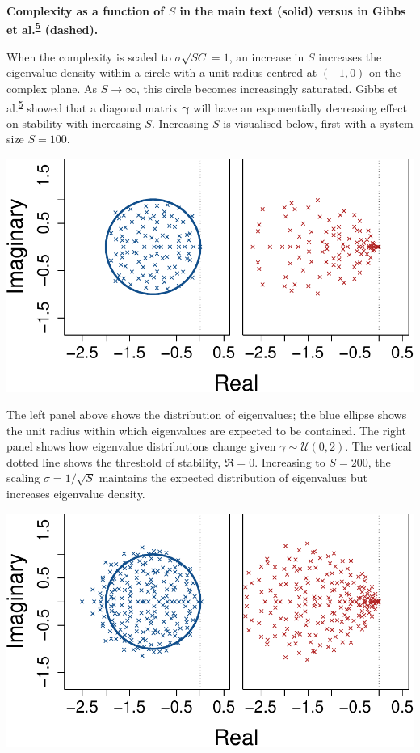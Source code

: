 \documentclass[]{article}
\begin{document}
\textbf{Complexity as a function of \(S\) in the main text (solid)
versus in Gibbs et
al.\textsuperscript{\protect\hyperlink{ref-Gibbs2017}{5}} (dashed).}

When the complexity is scaled to \(\sigma\sqrt{SC} = 1\), an increase in
\(S\) increases the eigenvalue density within a circle with a unit
radius centred at \((-1, 0)\) on the complex plane. As \(S \to \infty\),
this circle becomes increasingly saturated. Gibbs et
al.\textsuperscript{\protect\hyperlink{ref-Gibbs2017}{5}} showed that a
diagonal matrix \(\mathbf{\gamma}\) will have an exponentially
decreasing effect on stability with increasing \(S\). Increasing \(S\)
is visualised below, first with a system size \(S = 100\).

\includegraphics{SI_files/figure-latex/unnamed-chunk-36-1.pdf}

The left panel above shows the distribution of eigenvalues; the blue
ellipse shows the unit radius within which eigenvalues are expected to
be contained. The right panel shows how eigenvalue distributions change
given \(\gamma \sim \mathcal{U}(0,2)\). The vertical dotted line shows
the threshold of stability, \(\Re = 0\). Increasing to \(S = 200\), the
scaling \(\sigma = 1 / \sqrt{S}\) maintains the expected distribution of
eigenvalues but increases eigenvalue density.

\includegraphics{SI_files/figure-latex/unnamed-chunk-37-1.pdf}
\end{document}
